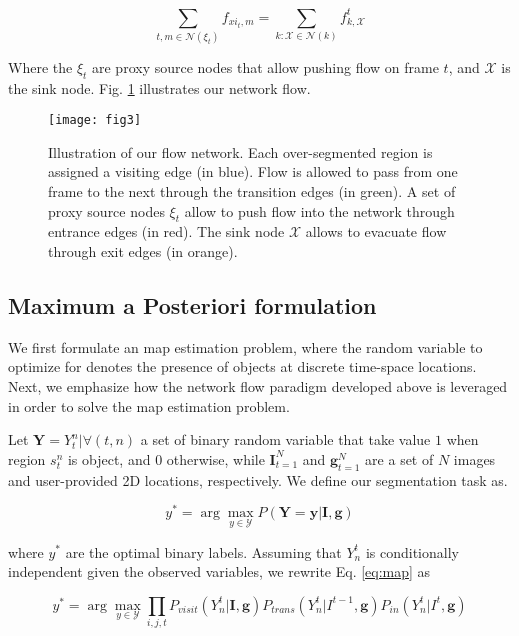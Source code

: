 \begin{equation}
  \label{eq:mass_constrain}
  \sum_{t,m\in \mathcal{N}(\xi_{t})}f_{xi_{t},m} = \sum_{k:\mathcal{X}\in\mathcal{N}(k)}f^{t}_{k,\mathcal{X}}
\end{equation}

Where the $\xi_{t}$ are proxy source nodes that allow pushing flow on frame $t$, and $\mathcal{X}$ is the sink node.
Fig. \ref{fig:flownetwork} illustrates our network flow.

\begin{figure}[!htpb]
  \centering
  \texttt{[image: fig3]}
  \caption{Illustration of our flow network. Each over-segmented region is assigned a visiting edge (in blue).
    Flow is allowed to pass from one frame to the next through the transition edges (in green).
    A set of proxy source nodes $\xi_{t}$ allow to push flow into the network through entrance edges (in red).
  The sink node $\mathcal{X}$ allows to evacuate flow through exit edges (in orange).}
  \label{fig:flownetwork}
\end{figure}

\subsection{Maximum a Posteriori formulation}
We first formulate an \gls{map} estimation problem, where the random variable to optimize for denotes the presence of objects at discrete time-space locations.
Next, we emphasize how the network flow paradigm developed above is leveraged in order to solve the \gls{map} estimation problem.

Let $\bm{Y}={Y^{n}_{t}|\forall(t,n)}$ a set of binary random variable that take value $1$ when region $s^{n}_{t}$ is object, and $0$ otherwise, while $\bm{I}_{t=1}^{N}$ and $\bm{g}_{t=1}^{N}$ are a set of $N$ images and user-provided 2D locations, respectively.
We define our segmentation task as.

\begin{equation}
  \label{eq:map}
  y^{*} = \arg \max_{y \in \mathcal{Y}}P(\bm{Y}=\bm{y}|\bm{I}, \bm{g})
\end{equation}

where $y^{*}$ are the optimal binary labels.
Assuming that $Y^{t}_{n}$ is conditionally independent given the observed variables, we rewrite Eq. \ref{eq:map} as

\begin{equation}
  \label{eq:bg_map2}
  y^{*} = \arg \max_{y \in \mathcal{Y}}\prod_{i,j,t} P_{visit}(Y^{t}_{n}|\bm{I}, \bm{g}) P_{trans}(Y^{t}_{n}|I^{t-1},\bm{g}) P_{in}(Y^{t}_{n}|I^{t},\bm{g})
\end{equation}

